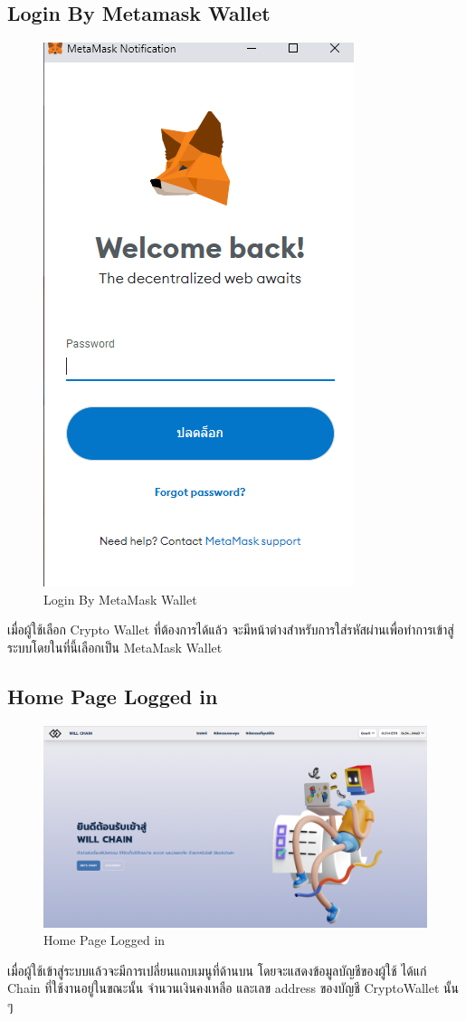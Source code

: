 \documentclass[12pt,oneside,openright,a4paper]{cpe-thai-project}
\begin{document}
\subsection{Login By Metamask Wallet}
	\begin{figure}[!thb]
			\centering
			\includegraphics[scale=0.2]{metamaskLogin4}
			\caption{Login By MetaMask Wallet}
		\end{figure}
		\FloatBarrier
\tab เมื่อผู้ใช้เลือก Crypto Wallet ที่ต้องการได้แล้ว จะมีหน้าต่างสำหรับการใส่รหัสผ่านเพื่อทำการเข้าสู่ระบบโดยในที่นี้เลือกเป็น MetaMask Wallet 
\subsection{Home Page Logged in}
	\begin{figure}[!thb]
			\centering
			\includegraphics[scale=0.2]{homePageAfter4}
			\caption{Home Page Logged in }
		\end{figure}
		\FloatBarrier
\tab เมื่อผู้ใช้เข้าสู่ระบบแล้วจะมีการเปลี่ยนแถบเมนูที่ด้านบน โดยจะแสดงข้อมูลบัญชีของผู้ใช้ ได้แก่ Chain ที่ใช้งานอยู่ในขณะนั้น จำนวนเงินคงเหลือ และเลข address ของบัญชี CryptoWallet นั้น ๆ 
\end{document}
